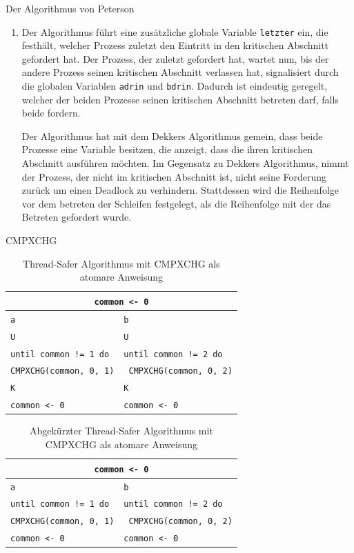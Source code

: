 \documentclass[a4paper,twoside,12pt,fleqn]{article}
\newcounter{AUFGNR}
\newcommand{\AUFGABE}[2]{\vspace{0.3cm}\item[Aufgabe~\arabic{AUFGNR}]\stepcounter{AUFGNR} #1\hfill\emph{#2}}
\begin{document}
\begin{description}
\AUFGABE{Der Algorithmus von Peterson}{}
\begin{enumerate}
\item Der Algorithmus führt eine zusätzliche globale Variable \texttt{letzter} ein, die festhält, welcher Prozess zuletzt den Eintritt in den kritischen Abschnitt gefordert hat. Der Prozess, der zuletzt gefordert hat, wartet nun, bis der andere Prozess seinen kritischen Abschnitt verlassen hat, signalisiert durch die globalen Variablen \texttt{adrin} und \texttt{bdrin}. Dadurch ist eindeutig geregelt, welcher der beiden Prozesse seinen kritischen Abschnitt betreten darf, falls beide fordern. 

Der Algorithmus hat mit dem Dekkers Algorithmus gemein, dass beide Prozesse eine Variable besitzen, die anzeigt, dass die ihren kritischen Abschnitt ausführen möchten. Im Gegensatz zu Dekkers Algorithmus, nimmt der Prozess, der nicht im kritischen Abschnitt ist, nicht seine Forderung zurück um einen Deadlock zu verhindern. Stattdessen wird die Reihenfolge vor dem betreten der Schleifen festgelegt, als die Reihenfolge mit der das Betreten gefordert wurde.
\end{enumerate}

\AUFGABE{CMPXCHG}{}
\begin{table}[h]
\centering
\begin{tabularx}{0.75\textwidth}{l | l}
\multicolumn{2}{c}{\texttt{common <- 0}}\\
\hline
\texttt{a} & \texttt{b}\\
\hline
\texttt{U} & \texttt{U} \\
\texttt{until common != 1 do} & \texttt{until common != 2 do} \\
\texttt{\hspace{2em}CMPXCHG(common, 0, 1)} & \texttt{\hspace{2em} CMPXCHG(common, 0, 2)} \\
\texttt{K} & \texttt{K} \\
\texttt{common <- 0} & \texttt{common <- 0}\\
\end{tabularx}
\caption{Thread-Safer Algorithmus mit CMPXCHG als atomare Anweisung}
\end{table}

\begin{table}[h]
\centering
\begin{tabularx}{0.75\textwidth}{l | l}
\multicolumn{2}{c}{\texttt{common <- 0}}\\
\hline
\texttt{a} & \texttt{b}\\
\hline
\texttt{until common != 1 do} & \texttt{until common != 2 do} \\
\texttt{\hspace{2em}CMPXCHG(common, 0, 1)} & \texttt{\hspace{2em} CMPXCHG(common, 0, 2)} \\
\texttt{common <- 0} & \texttt{common <- 0}\\
\end{tabularx}
\caption{Abgekürzter Thread-Safer Algorithmus mit CMPXCHG als atomare Anweisung}
\end{table}


\end{description}
\end{document}
